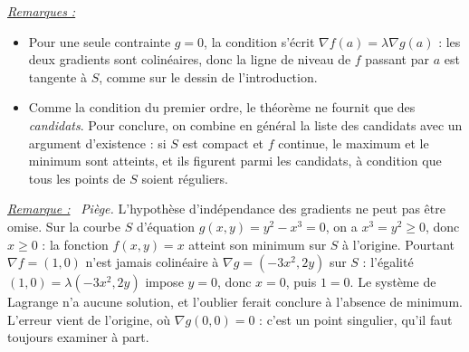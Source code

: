 \documentclass[a4paper,twoside]{report}
\newenvironment{remarque}%
 {\par\needspace{6\baselineskip}\vspace{1mm}\begin{list}{}{\leftmargin=1cm \rightmargin=0.5cm}\item[]%
  \textit{\underline{Remarque :}}~}%
 {\end{list}\vspace{1mm}}
\newenvironment{remarques}%
 {\par\needspace{6\baselineskip}\vspace{1mm}\begin{list}{}{\leftmargin=1cm \rightmargin=0.5cm}\item[]%
  \textit{\underline{Remarques :}}%
  \begin{itemize}[label=$\bullet$,leftmargin=0.45cm,topsep=3pt,itemsep=4pt]}%
 {\end{itemize}\end{list}\vspace{1mm}}
\newcommand{\grad}{\nabla}                        %
\begin{document}
\begin{remarques}
  \item Pour une seule contrainte $g = 0$, la condition s'écrit $\grad f(a) = \lambda\grad g(a)$ : les deux gradients sont colinéaires, donc la ligne de niveau de $f$ passant par $a$ est tangente à $S$, comme sur le dessin de l'introduction.
  \item Comme la condition du premier ordre, le théorème ne fournit que des \emph{candidats}. Pour conclure, on combine en général la liste des candidats avec un argument d'existence : si $S$ est compact et $f$ continue, le maximum et le minimum sont atteints, et ils figurent parmi les candidats, à condition que tous les points de $S$ soient réguliers.
\end{remarques}

\begin{remarque}
\emph{Piège.} L'hypothèse d'indépendance des gradients ne peut pas être omise. Sur la courbe $S$ d'équation $g(x, y) = y^{2} - x^{3} = 0$, on a $x^{3} = y^{2} \geqslant 0$, donc $x \geqslant 0$ : la fonction $f(x, y) = x$ atteint son minimum sur $S$ à l'origine. Pourtant $\grad f = (1, 0)$ n'est jamais colinéaire à $\grad g = (-3x^{2}, 2y)$ sur $S$ : l'égalité $(1, 0) = \lambda(-3x^{2}, 2y)$ impose $y = 0$, donc $x = 0$, puis $1 = 0$. Le système de Lagrange n'a aucune solution, et l'oublier ferait conclure à l'absence de minimum. L'erreur vient de l'origine, où $\grad g(0, 0) = 0$ : c'est un point singulier, qu'il faut toujours examiner à part.
\end{remarque}

\begin{center}
\end{center}
\end{document}
